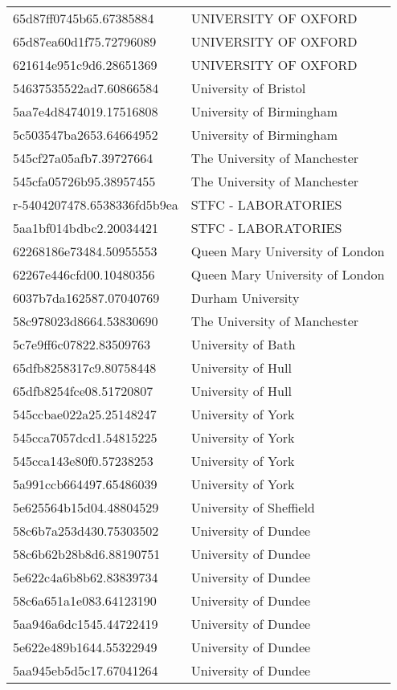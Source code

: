 \begin{tabular}{ll}
65d87ff0745b65.67385884 & UNIVERSITY OF OXFORD \\
65d87ea60d1f75.72796089 & UNIVERSITY OF OXFORD \\
621614e951c9d6.28651369 & UNIVERSITY OF OXFORD \\
54637535522ad7.60866584 & University of Bristol \\
5aa7e4d8474019.17516808 & University of Birmingham \\
5c503547ba2653.64664952 & University of Birmingham \\
545cf27a05afb7.39727664 & The University of Manchester \\
545cfa05726b95.38957455 & The University of Manchester \\
r-5404207478.6538336fd5b9ea & STFC - LABORATORIES \\
5aa1bf014bdbc2.20034421 & STFC - LABORATORIES \\
62268186e73484.50955553 & Queen Mary University of London \\
62267e446cfd00.10480356 & Queen Mary University of London \\
6037b7da162587.07040769 & Durham University \\
58c978023d8664.53830690 & The University of Manchester \\
5c7e9ff6c07822.83509763 & University of Bath \\
65dfb8258317c9.80758448 & University of Hull \\
65dfb8254fce08.51720807 & University of Hull \\
545ccbae022a25.25148247 & University of York \\
545cca7057dcd1.54815225 & University of York \\
545cca143e80f0.57238253 & University of York \\
5a991ccb664497.65486039 & University of York \\
5e625564b15d04.48804529 & University of Sheffield \\
58c6b7a253d430.75303502 & University of Dundee \\
58c6b62b28b8d6.88190751 & University of Dundee \\
5e622c4a6b8b62.83839734 & University of Dundee \\
58c6a651a1e083.64123190 & University of Dundee \\
5aa946a6dc1545.44722419 & University of Dundee \\
5e622e489b1644.55322949 & University of Dundee \\
5aa945eb5d5c17.67041264 & University of Dundee \\

\end{tabular}
